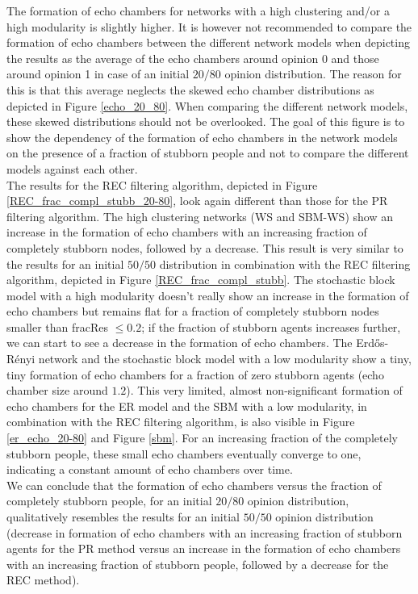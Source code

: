 \documentclass[11 pt , letterpaper , twoside , openright]{book}
\begin{document}
The formation of echo chambers for networks with a high clustering and/or a high modularity is slightly higher. It is however not recommended to compare the formation of echo chambers between the different network models when depicting the results as the average of the echo chambers around opinion 0 and those around opinion 1 in case of an initial $20/80$ opinion distribution. The reason for this is that this average neglects the skewed echo chamber distributions as depicted in Figure \ref{echo_20_80}. When comparing the different network models, these skewed distributions should not be overlooked. The goal of this figure is to show the dependency of the formation of echo chambers in the network models on the presence of a fraction of stubborn people and not to compare the different models against each other. \\
\newline
The results for the REC filtering algorithm, depicted in Figure \ref{REC_frac_compl_stubb_20-80}, look again different than those for the PR filtering algorithm. The high clustering networks (WS and SBM-WS) show an increase in the formation of echo chambers with an increasing fraction of completely stubborn nodes, followed by a decrease. This result is very similar to the results for an initial $50/50$ distribution in combination with the REC filtering algorithm, depicted in Figure \ref{REC_frac_compl_stubb}. The stochastic block model with a high modularity doesn't really show an increase in the formation of echo chambers but remains flat for a fraction of completely stubborn nodes smaller than fracRes $\leqslant 0.2$; if the fraction of stubborn agents increases further, we can start to see a decrease in the formation of echo chambers. The Erd\H{o}s-R\'{e}nyi network and the stochastic block model with a low modularity show a tiny, tiny formation of echo chambers for a fraction of zero stubborn agents (echo chamber size around $1.2$). This very limited, almost non-significant formation of echo chambers for the ER model and the SBM with a low modularity, in combination with the REC filtering algorithm, is also visible in Figure \ref{er_echo_20-80} and Figure \ref{sbm}. For an increasing fraction of the completely stubborn people, these small echo chambers eventually converge to one, indicating a constant amount of echo chambers over time.\\
\newline
We can conclude that the formation of echo chambers versus the fraction of completely stubborn people, for an initial $20/80$ opinion distribution, qualitatively resembles the results for an initial $50/50$ opinion distribution (decrease in formation of echo chambers with an increasing fraction of stubborn agents for the PR method versus an increase in the formation of echo chambers with an increasing fraction of stubborn people, followed by a decrease for the REC method). \\
\end{document}
